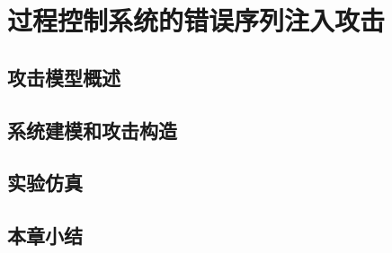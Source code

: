 
\chapter{过程控制系统的错误序列注入攻击}
\label{chap:FSI attack}

\section{攻击模型概述}
\label{sec:list}



\section{系统建模和攻击构造}
\label{sec:matheq}


\section{实验仿真}
\label{sec:insertimage}

\section{本章小结}
\label{sec:insertimage}

